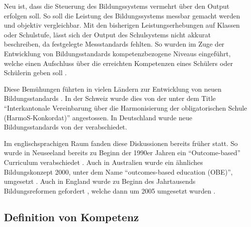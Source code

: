 Neu ist, dass die Steuerung des Bildungssystems vermehrt über den Output erfolgen soll. So soll die Leistung des Bildungssystems messbar gemacht werden und objektiv vergleichbar. Mit den bisherigen Leistungserhebungen auf Klassen oder Schulstufe, lässt sich der Output des Schulsystems nicht akkurat beschreiben, da festgelegte Messstandards fehlten. So wurden im Zuge der Entwicklung von Bildungsstandards kompetenzbezogene Niveaus eingeführt, welche einen Aufschluss über die erreichten Kompetenzen eines Schülers oder Schülerin geben soll \citep{Oelkers2008}.


Diese Bemühungen führten in vielen Ländern zur Entwicklung von neuen Bildungsstandards \citep{Berner2006}. In der Schweiz wurde dies von der \citet{EDKSchweizerKonfernezderKantonalenErziehungsdirektoren2004} unter dem Title "`Interkantonale Vereinbarung über die Harmonisierung der obligatorischen Schule (HarmoS-Konkordat)"' angestossen. In Deutschland wurde neue Bildungsstandards von der \citet{Kultusministerkonferenz2004} verabschiedet.

Im englischsprachigen Raum fanden diese Diskussionen bereits früher statt. So wurde in Neuseeland bereits zu Beginn der 1990er Jahren ein "`Outcome-based"' Curriculum verabschiedet \citep{McGee1996}. Auch in Australien wurde ein ähnliches Bildungskonzept 2000,  unter dem Name "`outcomes-based education (OBE)"', umgesetzt  \citep{Killen2000}. Auch in England wurde zu Beginn des Jahrtausends Bildungsreformen gefordert \citep{Millar1999}, welche dann um 2005 umgesetzt wurden \citep{Huber2006}.




\subsection{Definition von Kompetenz}

